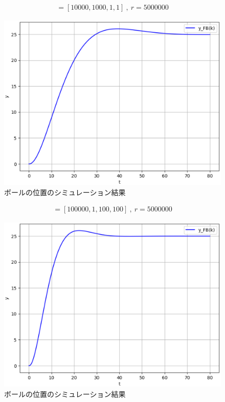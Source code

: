 \documentclass[a4paper,10.5pt]{ltjsarticle}
\begin{document}
\clearpage
\begin{align}
  [q_1,q_2,q_3,q_4]=[10000,1000,1,1]\ ,\ r=5000000
\end{align}
\begin{figure}[h]
  \centering
  \vspace{-30pt}\includegraphics[scale=0.5]{figure14.eps}
  \caption{ボールの位置のシミュレーション結果}
  \label{fig:figure14}
\end{figure}
\begin{align}
  [q_1,q_2,q_3,q_4]=[100000,1,100,100]\ ,\ r=5000000
\end{align}
\begin{figure}[h]
  \centering
  \vspace{-30pt}\includegraphics[scale=0.5]{figure15.eps}
  \caption{ボールの位置のシミュレーション結果}
  \label{fig:figure15}
\end{figure}\\
\end{document}
